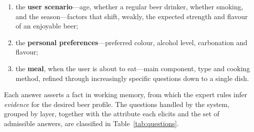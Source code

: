 \begin{enumerate}[nosep]
    \item the \textbf{user scenario}---age, whether a regular beer drinker,
    whether smoking, and the season---factors that shift, weakly, the expected
    strength and flavour of an enjoyable beer;
    \item the \textbf{personal preferences}---preferred colour, alcohol level,
    carbonation and flavour;
    \item the \textbf{meal}, when the user is about to eat---main component, type
    and cooking method, refined through increasingly specific questions down to a
    single dish.
\end{enumerate}

Each answer asserts a fact in working memory, from which the expert rules infer
\emph{evidence} for the desired beer profile. The questions handled by the
system, grouped by layer, together with the attribute each elicits and the set
of admissible answers, are classified in Table~\ref{tab:questions}.

